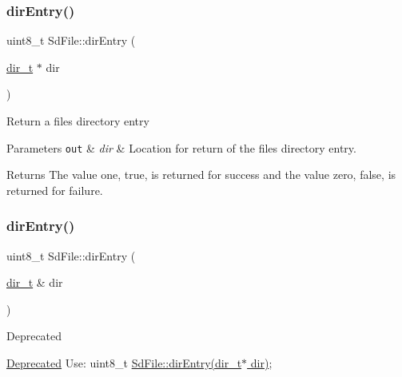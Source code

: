 \subsubsection{\texorpdfstring{dir\+Entry()}{dirEntry()}\hspace{0.1cm}{\footnotesize\ttfamily [1/2]}}
{\footnotesize\ttfamily uint8\+\_\+t Sd\+File\+::dir\+Entry (\begin{DoxyParamCaption}\item[{\hyperlink{_fat_structs_8h_a803db59d4e16a0c54a647afc6a7954e3}{dir\+\_\+t} $\ast$}]{dir }\end{DoxyParamCaption})}

Return a files directory entry


\begin{DoxyParams}[1]{Parameters}
\mbox{\tt out}  & {\em dir} & Location for return of the files directory entry.\\
\hline
\end{DoxyParams}
\begin{DoxyReturn}{Returns}
The value one, true, is returned for success and the value zero, false, is returned for failure. 
\end{DoxyReturn}
\mbox{\label{class_sd_file_ae7b4b1057a1ee17f673c116771636156}} 
\subsubsection{\texorpdfstring{dir\+Entry()}{dirEntry()}\hspace{0.1cm}{\footnotesize\ttfamily [2/2]}}
{\footnotesize\ttfamily uint8\+\_\+t Sd\+File\+::dir\+Entry (\begin{DoxyParamCaption}\item[{\hyperlink{_fat_structs_8h_a803db59d4e16a0c54a647afc6a7954e3}{dir\+\_\+t} \&}]{dir }\end{DoxyParamCaption})\hspace{0.3cm}{\ttfamily [inline]}}

\begin{DoxyRefDesc}{Deprecated}
\item[\hyperlink{deprecated__deprecated000004}{Deprecated}]Use\+: uint8\+\_\+t \hyperlink{class_sd_file_abaf9b1dc12d53cdeb937065edf68927d}{Sd\+File\+::dir\+Entry(dir\+\_\+t$\ast$ dir)}; \end{DoxyRefDesc}
\mbox{\label{class_sd_file_ad4381e541a53a7e5cf51a866c1c8f79e}} 
